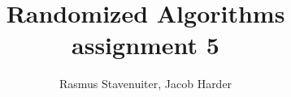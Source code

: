 

\title{Randomized Algorithms assignment 5}
\author{Rasmus Stavenuiter, Jacob Harder}


\maketitle

%






